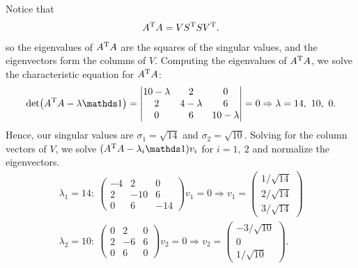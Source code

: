 
Notice that 
\begin{eqnarray}
    \label{eq:A-AT}
    A^{\rm T} A = V S^{\rm T} S V^{\rm T}
.\end{eqnarray}
so the eigenvalues of $A^{\rm T} A$ are the squares of the singular values, and the eigenvectors form the columns of $V$. 
Computing the eigenvalues of $A^{\rm T} A$, we solve the characteristic equation for $A^{\rm T} A$:
\begin{eqnarray}
    \label{eq:AT-A}
    \det(A^{\rm T} A - \lambda \id) = 
    \begin{vmatrix}
        10 - \lambda & 2 & 0 \\
        2  & 4 - \lambda & 6 \\
        0  & 6 & 10 - \lambda 
    \end{vmatrix}
    =
    0
    \Rightarrow \lambda = 14,~10,~0
.\end{eqnarray}
Hence, our singular values are $\sigma_1 = \sqrt{14}$ and $\sigma_2 = \sqrt{10}$.
Solving for the column vectors of $V$, we solve $(A^{\rm T}A - \lambda_i \id) v_i$ for $i = 1,~2$ and normalize the eigenvectors.
\begin{align*}
    \label{eq:v1-v2}
    \lambda_1 = 14:~
    \begin{pmatrix}
    -4 & 2 & 0 \\
    2 & -10 & 6 \\
    0 & 6 & -14
    \end{pmatrix}
    v_1
    = 0
    \Rightarrow v_1 = 
    \begin{pmatrix}
    1/\sqrt{14} \\ 2/\sqrt{14} \\ 3/\sqrt{14}
    \end{pmatrix} \\
    \lambda_2 = 10:~
    \begin{pmatrix}
    0 & 2 & 0 \\
    2 & -6 & 6 \\
    0 & 6 & 0
    \end{pmatrix}
    v_2
    = 0
    \Rightarrow v_2 = 
    \begin{pmatrix}
    -3/\sqrt{10} \\ 0 \\ 1/\sqrt{10} 
    \end{pmatrix} 
.\end{align*}
